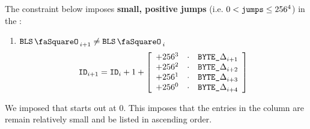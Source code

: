 The constraint below imposes \textbf{small, positive jumps} (i.e. $0 < \texttt{jumps} \leq 256^{4}$) in the \blsId:
\begin{enumerate}
    \item \If $\blsStamp_{i + 1} \neq \blsStamp_i$ \Then
	\[
	    \texttt{ID}_{i + 1} = \texttt{ID}_{i} + 1 +
	    \left[ \begin{array}{rcr}
		+ 256 ^ {3} &\cdot& \texttt{BYTE}\texttt{\_$\Delta$}_{i + 1} \\
		+ 256 ^ {2} &\cdot& \texttt{BYTE}\texttt{\_$\Delta$}_{i + 2} \\
		+ 256 ^ {1} &\cdot& \texttt{BYTE}\texttt{\_$\Delta$}_{i + 3} \\
		+ 256 ^ {0} &\cdot& \texttt{BYTE}\texttt{\_$\Delta$}_{i + 4} \\
	    \end{array} \right]
	\]
\end{enumerate}
\saNote{} We imposed that \blsId{} starts out at $0$. This imposes that the entries in the \blsId{} column are remain relatively small and be listed in ascending order.
